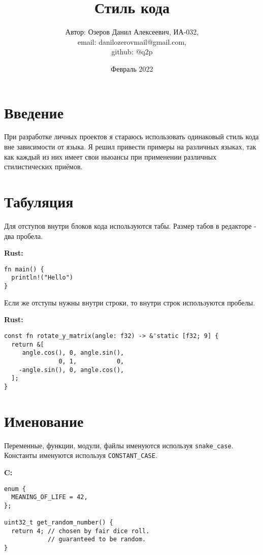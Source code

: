\documentclass[12p]{article}
\begin{document}
\title{Стиль кода}
\author{Автор: Озеров Данил Алексеевич, ИА-032,\\ email: danilozerovmail@gmail.com,\\ github: @q2p}
\date{Февраль 2022}

\maketitle

\section{Введение}

При разработке личных проектов я стараюсь использовать одинаковый стиль кода вне зависимости от языка.
Я решил привести примеры на различных языках, так как каждый из них имеет свои ньюансы при применении различных стилистических приёмов.

\section{Табуляция}

Для отступов внутри блоков кода используются табы. Размер табов в редакторе - два пробела.\newline

\textbf{Rust:}
\begin{verbatim}
fn main() {
  println!("Hello")
}
\end{verbatim}

Если же отступы нужны внутри строки, то внутри строк используются пробелы.\newline

\textbf{Rust:}
\begin{verbatim}
const fn rotate_y_matrix(angle: f32) -> &'static [f32; 9] {
  return &[
     angle.cos(), 0, angle.sin(),
               0, 1,           0,
    -angle.sin(), 0, angle.cos(),
  ];
}
\end{verbatim}
\pagebreak

\section{Именование}

Переменные, функции, модули, файлы именуются используя \texttt{snake_case}. Константы именуются используя \texttt{CONSTANT_CASE}.\newline

\textbf{C:}
\begin{verbatim}
enum {
  MEANING_OF_LIFE = 42,
};

uint32_t get_random_number() {
  return 4; // chosen by fair dice roll.
            // guaranteed to be random.
}
\end{verbatim}
\end{document}
